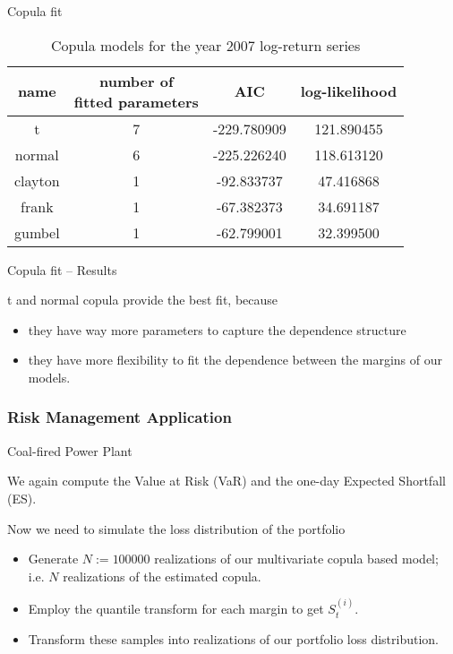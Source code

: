 {Copula fit}

\begin{table}[ht]
            \vspace{0.5cm}
            \begin{center}
                \begin{tabular}{c|c|c|c}
                    name&\parbox{3cm}{\centering number of\\ fitted parameters}&AIC&log-likelihood\\\hline
                    t&7&-229.780909&121.890455\\
                    normal&6&-225.226240&118.613120\\
                    clayton&1&-92.833737&47.416868\\
                    frank&1&-67.382373&34.691187\\
                    gumbel&1&-62.799001&32.399500\\
                \end{tabular}
                \caption{Copula models for the year 2007 log-return series}
            \end{center}
        \end{table}





{Copula fit -- Results}

t and normal copula provide the best fit,  because
\begin{itemize}
\item they have way more parameters to capture the dependence
structure \item they have more flexibility to fit the dependence
between the margins of our models.
\end{itemize}





\subsubsection{Risk Management Application}

{Coal-fired Power Plant}

We again compute the Value at Risk (VaR) and the one-day Expected
Shortfall (ES).

Now we need to simulate the loss distribution of the portfolio

\begin{itemize}
\item Generate $N:=100000$ realizations of our multivariate copula
based model; i.e. $N$ realizations of the estimated copula. \item
Employ the quantile transform for each margin to get $S_t^{(i)}$.
\item Transform these samples into realizations of our portfolio
loss distribution.

\end{itemize}


